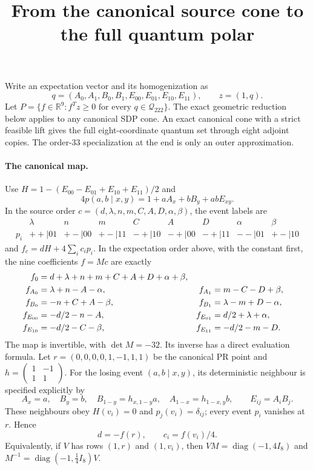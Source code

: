 \documentclass[11pt]{article}
\title{From the canonical source cone to the full quantum polar}
\author{}\date{}
\newcommand{\R}{\mathbb R}
\begin{document}
\maketitle\vspace{-2em}

Write an expectation vector and its homogenization as
\[
 q=(A_0,A_1,B_0,B_1,E_{00},E_{01},E_{10},E_{11}),\qquad z=(1,q).
\]
Let $P=\{f\in\R^9:f^Tz\ge0\text{ for every }q\in\mathcal Q_{222}\}$.
The exact geometric reduction below applies to any canonical SDP cone.
An exact canonical cone with a strict feasible lift gives the full
eight-coordinate quantum set through eight adjoint copies. The
order-$33$ specialization at the end is only an outer approximation.

\paragraph{The canonical map.}
Use $H=1-(E_{00}-E_{01}+E_{10}+E_{11})/2$ and
\[
 4p(a,b\mid x,y)=1+aA_x+bB_y+abE_{xy}.
\]
In the source order $c=(d,\lambda,n,m,C,A,D,\alpha,\beta)$, the event
labels are
\[
\begin{array}{c|cccccccc}
 &\lambda&n&m&C&A&D&\alpha&\beta\\\hline
 p_i&++|01&+-|00&+-|11&-+|10&-+|00&-+|11&--|01&+-|10
\end{array}
\]
and $f_c=dH+4\sum_i c_i p_i$. In the expectation order above, with
the constant first, the nine coefficients $f=Mc$ are exactly
\begin{align}
 f_0&=d+\lambda+n+m+C+A+D+\alpha+\beta,\notag\\
 f_{A_0}&=\lambda+n-A-\alpha,&
 f_{A_1}&=m-C-D+\beta,\notag\\
 f_{B_0}&=-n+C+A-\beta,&
 f_{B_1}&=\lambda-m+D-\alpha,\notag\\
 f_{E_{00}}&=-d/2-n-A,& f_{E_{01}}&=d/2+\lambda+\alpha,\notag\\
 f_{E_{10}}&=-d/2-C-\beta,& f_{E_{11}}&=-d/2-m-D.
                                                               \label{eq:map}
\end{align}
The map is invertible, with $\det M=-32$. Its inverse has a direct
evaluation formula. Let
$r=(0,0,0,0,1,-1,1,1)$ be the canonical PR point and
$h=\left(\begin{smallmatrix}1&-1\\1&1\end{smallmatrix}\right)$.
For the losing event $(a,b\mid x,y)$, its deterministic neighbour is
specified explicitly by
\[
 A_x=a,\quad B_y=b,\quad
 B_{1-y}=h_{x,1-y}a,\quad A_{1-x}=h_{1-x,y}b,
 \qquad E_{ij}=A_iB_j.
\]
These neighbours obey $H(v_i)=0$ and $p_j(v_i)=\delta_{ij}$;
every event $p_i$ vanishes at $r$. Hence
\begin{equation}
 d=-f(r),\qquad c_i=f(v_i)/4.                            \label{eq:inverse}
\end{equation}
Equivalently, if $V$ has rows $(1,r)$ and $(1,v_i)$, then
$VM=\operatorname{diag}(-1,4I_8)$ and
$M^{-1}=\operatorname{diag}(-1,\tfrac14 I_8)V$.
\end{document}

